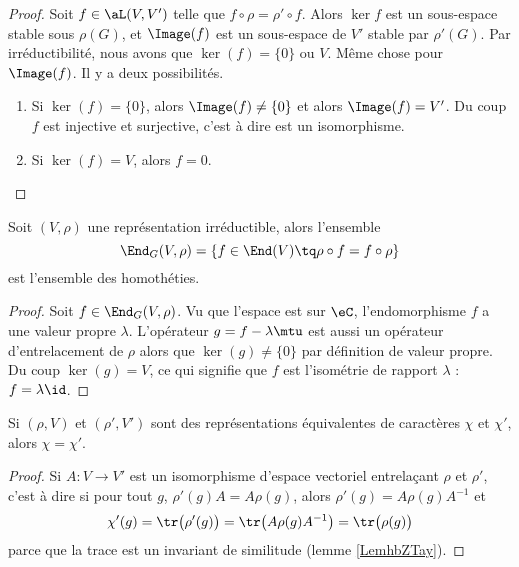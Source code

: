 \begin{proof}
    Soit \( f\in\aL(V,V')\) telle que \( f\circ \rho=\rho'\circ f\). Alors \( \ker f\) est un sous-espace stable sous \( \rho(G)\), et \( \Image(f)\) est un sous-espace de \( V'\) stable par \( \rho'(G)\). Par irréductibilité, nous avons que \( \ker(f)=\{ 0 \}\) ou \( V\). Même chose pour \( \Image(f)\). Il y a deux possibilités.
    \begin{enumerate}
        \item
            Si \( \ker(f)=\{ 0 \}\), alors \( \Image(f)\neq \{ 0 \}\) et alors \( \Image(f)=V'\). Du coup \( f\) est injective et surjective, c'est à dire est un isomorphisme.
        \item
            Si \( \ker(f)=V\), alors \( f=0\).
    \end{enumerate}
\end{proof}

\begin{corollary}
    Soit \( (V,\rho)\) une représentation irréductible, alors l'ensemble
    \begin{equation}
        \End_{G}(V,\rho)=\{ f\in\End(V)\tq \rho\circ f=f\circ \rho \}
    \end{equation}
    est l'ensemble des homothéties.
\end{corollary}

\begin{proof}
    Soit \( f\in\End_{G}(V,\rho)\). Vu que l'espace est sur \( \eC\), l'endomorphisme \( f\) a une valeur propre \( \lambda\). L'opérateur \( g=f-\lambda\mtu\) est aussi un opérateur d'entrelacement de \( \rho\) alors que \( \ker(g)\neq \{ 0 \}\) par définition de valeur propre. Du coup \( \ker(g)=V\), ce qui signifie que \( f\) est l'isométrie de rapport \( \lambda\) : \( f=\lambda\id\).
\end{proof}

\begin{lemma}   \label{LempUSOlo}
    Si \( (\rho,V)\) et \( (\rho',V')\) sont des représentations équivalentes de caractères \( \chi\) et \( \chi'\), alors \( \chi=\chi'\).
\end{lemma}

\begin{proof}
    Si \( A\colon V\to V'\) est un isomorphisme d'espace vectoriel entrelaçant \( \rho\) et \( \rho'\), c'est à dire si pour tout \( g\), \( \rho'(g)A=A\rho(g)\), alors \( \rho'(g)=A\rho(g)A^{-1}\) et
    \begin{equation}
        \chi'(g)=\tr\big( \rho'(g) \big)=\tr\big( A\rho(g)A^{-1} \big)=\tr\big( \rho(g) \big)
    \end{equation}
    parce que la trace est un invariant de similitude (lemme \ref{LemhbZTay}).
\end{proof}

